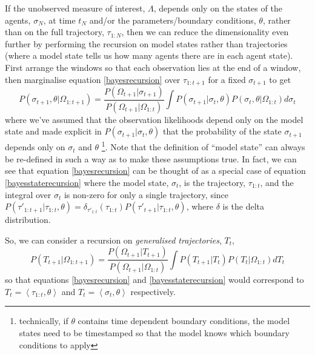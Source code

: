 \documentclass{article}
\begin{document}
If the unobserved measure of interest, $\Lambda$, depends only on the states of the agents, $\sigma_N$, at time $t_N$ and/or the parameters/boundary conditions, $\theta$, rather than on the full trajectory, $\tau_{1:N}$, then we can reduce the dimensionality even further by performing the recursion on model states rather than trajectories (where a model state tells us how many agents there are in each agent state). First arrange the windows so that each observation lies at the end of a window, then marginalise equation \eqref{bayesrecursion} over $\tau_{1:t+1}$ for a fixed $\sigma_{t+1}$ to get
\begin{equation}
P\left(\sigma_{t+1}, \theta | \Omega_{1:t+1}\right)
=
\frac{ P(\Omega_{t+1}|\sigma_{t+1}) 
}
{	P(\Omega_{t+1}| \Omega_{1:t}) }
\int P(\sigma_{t+1}|\sigma_t,\theta)P\left(\sigma_{t},\theta| \Omega_{1:t}\right) d \sigma_t
\label{bayesstaterecursion}
\end{equation}
where we've assumed that the observation likelihoods depend only on the model state and made explicit in $P(\sigma_{t+1}|\sigma_t,\theta)$ that the probability of the state $\sigma_{t+1}$ depends only on $\sigma_t$ and $\theta$  \footnote{technically, if $\theta$ contains time dependent boundary conditions, the model states need to be timestamped so that the model knows which boundary conditions to apply}.   Note that the definition of ``model state'' can always be re-defined in such a way as to make these assumptions true. In fact, we can see that equation \eqref{bayesrecursion} can be thought of as a special case of equation \eqref{bayesstaterecursion} where the model state, $\sigma_t$, is the trajectory, $\tau_{1:t}$, and the integral over $\sigma_t$ is non-zero for only a single trajectory, since $P(\tau'_{1:t+1}|\tau_{1:t},\theta) = \delta_{\tau'_{1:t}}(\tau_{1:t})P(\tau'_{t+1}|\tau_{1:t},\theta)$, where $\delta$ is the delta distribution.

So, we can consider a recursion on \textit{generalised trajectories}, $T_t$,
\begin{equation}
P\left(T_{t+1}| \Omega_{1:t+1}\right)
=
\frac{ P(\Omega_{t+1}|T_{t+1})}
{	P(\Omega_{t+1}| \Omega_{1:t}) }
\int P(T_{t+1}|T_t)P\left(T_{t}| \Omega_{1:t}\right) d T_t
\label{generalisedbayesrecursion}
\end{equation}
so that equations \eqref{bayesrecursion} and \eqref{bayesstaterecursion} would correspond to $T_t=\left<\tau_{1:t},\theta\right>$ and $T_t=\left<\sigma_t,\theta\right>$ respectively.
\end{document}

